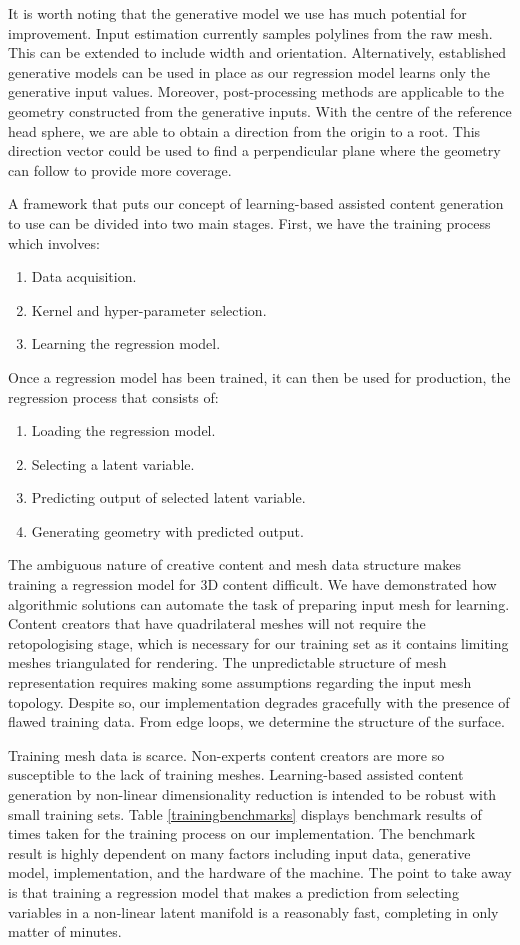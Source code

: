 \documentclass[ %
author={Dillon Keith Diep},
supervisor={Dr. Carl Henrik Ek},
degree={MEng},
title={ART-CG Hair:},
subtitle={Assisted Real-time Content Generation of Stylised Virtual Hair},
type={Research},
year={2017} ]{dissertation}
\begin{document}
It is worth noting that the generative model we use has much potential for improvement. Input estimation currently samples polylines from the raw mesh. This can be extended to include width and orientation. Alternatively, established generative models can be used in place as our regression model learns only the generative input values. Moreover, post-processing methods are applicable to the geometry constructed from the generative inputs. With the centre of the reference head sphere, we are able to obtain a direction from the origin to a root. This direction vector could be used to find a perpendicular plane where the geometry can follow to provide more coverage.

A framework that puts our concept of learning-based assisted content generation to use can be divided into two main stages. First, we have the training process which involves:
\begin{enumerate}
	\item Data acquisition.
	\item Kernel and hyper-parameter selection.
	\item Learning the regression model.
\end{enumerate}
Once a regression model has been trained, it can then be used for production, the regression process that consists of:
\begin{enumerate}
	\item Loading the regression model.
	\item Selecting a latent variable.
	\item Predicting output of selected latent variable.
	\item Generating geometry with predicted output.
\end{enumerate}

The ambiguous nature of creative content and mesh data structure makes training a regression model for 3D content difficult. We have demonstrated how algorithmic solutions can automate the task of preparing input mesh for learning. Content creators that have quadrilateral meshes will not require the retopologising stage, which is necessary for our training set as it contains limiting meshes triangulated for rendering. The unpredictable structure of mesh representation requires making some assumptions regarding the input mesh topology. Despite so, our implementation degrades gracefully with the presence of flawed training data. From edge loops, we determine the structure of the surface.

Training mesh data is scarce. Non-experts content creators are more so susceptible to the lack of training meshes. Learning-based assisted content generation by non-linear dimensionality reduction is intended to be robust with small training sets. Table \ref{trainingbenchmarks} displays benchmark results of times taken for the training process on our implementation. The benchmark result is highly dependent on many factors including input data, generative model, implementation, and the hardware of the machine. The point to take away is that training a regression model that makes a prediction from selecting variables in a non-linear latent manifold is a reasonably fast, completing in only matter of minutes.
\end{document}
